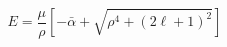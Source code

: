 \begin{equation}                              
E=\frac{\mu}{\rho} [-\bar{\alpha}  + \sqrt{\rho^{4} +      
(2\ell + 1)^{2}}]                              
\end{equation} 
